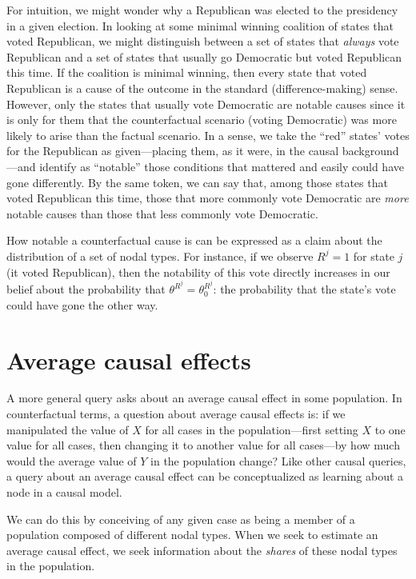 \documentclass[
  12pt,
]{book}
\begin{document}
For intuition, we might wonder why a Republican was elected to the presidency in a given election. In looking at some minimal winning coalition of states that voted Republican, we might distinguish between a set of states that \emph{always} vote Republican and a set of states that usually go Democratic but voted Republican this time. If the coalition is minimal winning, then every state that voted Republican is a cause of the outcome in the standard (difference-making) sense. However, only the states that usually vote Democratic are notable causes since it is only for them that the counterfactual scenario (voting Democratic) was more likely to arise than the factual scenario. In a sense, we take the ``red'' states' votes for the Republican as given---placing them, as it were, in the causal background---and identify as ``notable'' those conditions that mattered and easily could have gone differently. By the same token, we can say that, among those states that voted Republican this time, those that more commonly vote Democratic are \emph{more} notable causes than those that less commonly vote Democratic.

How notable a counterfactual cause is can be expressed as a claim about the distribution of a set of nodal types. For instance, if we observe \(R^j=1\) for state \(j\) (it voted Republican), then the notability of this vote directly increases in our belief about the probability that \(\theta^{R^j}=\theta_0^{R^j}\): the probability that the state's vote could have gone the other way.

\hypertarget{average-causal-effects}{%
\section{Average causal effects}\label{average-causal-effects}}

A more general query asks about an average causal effect in some population. In counterfactual terms, a question about average causal effects is: if we manipulated the value of \(X\) for all cases in the population---first setting \(X\) to one value for all cases, then changing it to another value for all cases---by how much would the average value of \(Y\) in the population change? Like other causal queries, a query about an average causal effect can be conceptualized as learning about a node in a causal model.

We can do this by conceiving of any given case as being a member of a population composed of different nodal types. When we seek to estimate an average causal effect, we seek information about the \emph{shares} of these nodal types in the population.
\end{document}
